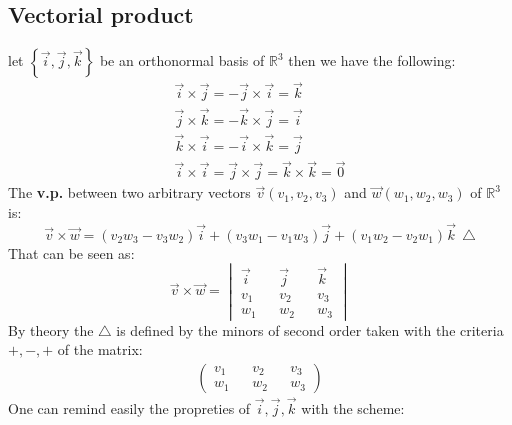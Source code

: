 \documentclass{article}
\begin{document}
    \subsection*{Vectorial product}
        let $\left\{ \vec{i},\vec{j},\vec{k} \right\}$ be an orthonormal basis of $\mathbb{R}^3$ then we have the following: 
        \begin{gather*}
            \vec{i} \times \vec{j} = -\vec{j} \times \vec{i} = \vec{k} \\
            \vec{j} \times \vec{k} = -\vec{k} \times \vec{j} = \vec{i} \\
            \vec{k} \times \vec{i} = -\vec{i} \times \vec{k} = \vec{j} \\
            \vec{i} \times \vec{i} = \vec{j} \times \vec{j} = \vec{k} \times \vec{k} = \vec{0} 
        \end{gather*}
        The \textbf{v.p.} between two arbitrary vectors $\vec{v}(v_1,v_2,v_3)$ and $\vec{w}(w_1,w_2,w_3)$ of $\mathbb{R}^3$ is:
        \begin{equation*}
            \vec{v} \times \vec{w} = \left(v_2w_3 - v_3w_2\right)\vec{i} + \left(v_3w_1 - v_1w_3\right) \vec{j} + \left(v_1w_2 - v_2w_1\right) \vec{k} \ \ \triangle 
        \end{equation*}
        That can be seen as:
        \begin{equation*}
            \vec{v} \times \vec{w} = \begin{vmatrix}
                \vec{i} && \vec{j} && \vec{k} \\
                v_1 && v_2 && v_3 \\
                w_1 && w_2 && w_3
            \end{vmatrix}
        \end{equation*}
        By theory the $\triangle$ is defined by the minors of second order taken with the criteria $+,-,+$ of the matrix:
        \begin{gather*}
            \left(\begin{matrix}
                v_1 && v_2 && v_3 \\
                w_1 && w_2 && w_3
            \end{matrix}\right) 
        \end{gather*}
        One can remind easily the propreties of $\vec{i},\vec{j},\vec{k}$ with the scheme:
        \begin{center}
        \end{center}
\end{document}
